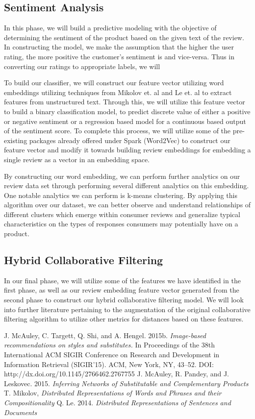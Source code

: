 \documentclass[a4paper, 11pt]{article}
\begin{document}
\subsection{Sentiment Analysis}
In this phase, we will build a predictive modeling with the objective of determining the sentiment of the product based on the given text of the review. In constructing the model, we make the assumption that the higher the user rating, the more positive the customer's sentiment is and vice-versa. Thus in converting our ratings to appropriate labels, we will 

To build our classifier, we will construct our feature vector utilizing word embeddings utilizing techniques from Mikolov et. al and Le et. al \cite{Mikolov,QuocLe14} to extract features from unstructured text. Through this, we will utilize this feature vector to build a binary classification model, to predict discrete value of either a positive or negative sentiment or a regression based model for a continuous based output of the sentiment score. To complete this process, we will utilize some of the pre-existing packages already offered under Spark (Word2Vec) to construct our feature vector and modify it towards building review embeddings for embedding a single review as a vector in an embedding space.

By constructing our word embedding, we can perform further analytics on our review data set through performing several different analytics on this embedding. One notable analytics we can perform is k-means clustering. By applying this algorithm over our dataset, we can better observe and understand relationships of different clusters which emerge within consumer reviews and generalize typical characteristics on the types of responses consumers may potentially have on a product.

\subsection{Hybrid Collaborative Filtering}
In our final phase, we will utilize some of the features we have identified in the first phase, as well as our review embedding feature vector generated from the second phase to construct our hybrid collaborative filtering model. We will look into further literature pertaining to the augmentation of the original collaborative filtering algorithm to utilize other metrics for distances based on these features. 

\begin{thebibliography}{9}
 J. McAuley, C. Targett, Q. Shi, and A. Hengel. 2015b. \emph{Image-based recommendations on styles and substitutes.} In Proceedings of the 38th International ACM SIGIR Conference on Research and Development in Information Retrieval (SIGIR’15). ACM, New York, NY, 43–52. DOI: http://dx.doi.org/10.1145/2766462.2767755
 J. McAuley, R. Pandey, and J. Leskovec. 2015. \emph{Inferring Networks of Substitutable and Complementary Products}
 T. Mikolov, \emph{Distributed Representations of Words and Phrases and their Compositionality}
 Q. Le. 2014. \emph{Distributed Representations of Sentences and Documents}

\end{thebibliography}
\end{document}
